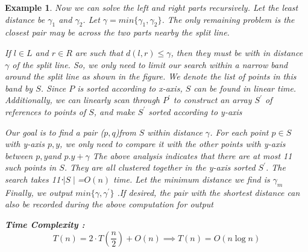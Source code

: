 \documentclass[twoside]{article}
\newtheorem{ex}[theorem]{Example}
\begin{document}
\begin{ex}
Now we can solve the left and right parts recursively. Let the least distance be \(\gamma_1\) and \(\gamma_2\). Let \(\gamma = min\{\gamma_1, \gamma_2\}\). The only remaining problem is the closest pair may be across the two parts nearby the split line. 

If \(l \in L \) and \(r \in R\) are such that \(d(l, r) \leq \gamma\), then they must be with in distance \(\gamma\) of the split line. So, we only need to limit our search within a narrow band around the split line as shown in the figure. We denote the list of points in this band by \(S\). Since \(P\) is sorted according to x-axis, \(S\) can be found in linear time. Additionally, we can linearly scan through \(P^\prime\) to construct an array \(S^\prime\) of references to points of \(S\), and make \(S^\prime\) sorted according to y-axis

Our goal is to find a pair (\(p, q\))from \(S\) within distance \(\gamma\). For each point \(p \in S\) with y-axis \(p, y\), we only need to compare it with the other points with y-axis between \(p, y\)and \(p.y + \gamma\) The above analysis indicates that there are at most 11 such points in \(S\). They are all clustered together in the y-axis sorted \(S^\prime\). The search takes 11⋅\(\mid S \mid \)=\(O(n)\) time. Let the minimum distance we find is \(\gamma_m\) Finally, we output \(min\{ \gamma, \gamma^\prime\}\) .If desired, the pair with the shortest distance can also be recorded during the above computation for output

\textbf{Time Complexity : } 
\[T(n) = 2 \cdot T(\frac{n}{2}) + O(n) \implies T(n) = O(n \log n )\] 

 \end{ex} 
 
\end{document}
